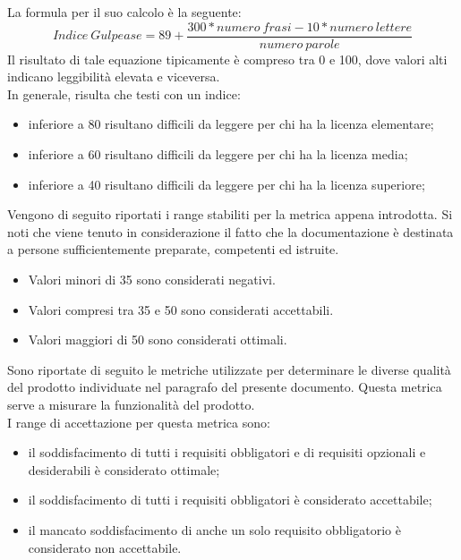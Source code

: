 					La formula per il suo calcolo è la seguente:
					\begin{equation}
						\label{eq:gulpease}
						Indice\ Gulpease = 89 + \frac{300*numero\ frasi-10*numero\ lettere}{numero\ parole}
					\end{equation}
					Il risultato di tale equazione tipicamente è compreso tra 0 e 100, dove valori alti indicano leggibilità elevata e viceversa.\\
					In generale, risulta che testi con un indice:
					\begin{itemize}
						\item inferiore a 80 risultano difficili da leggere per chi ha la licenza elementare;
						\item inferiore a 60 risultano difficili da leggere per chi ha la licenza media;
						\item inferiore a 40 risultano difficili da leggere per chi ha la licenza superiore;
					\end{itemize}
					Vengono di seguito riportati i range stabiliti per la metrica appena introdotta. Si noti che viene tenuto in considerazione il fatto 
					che la documentazione è destinata a persone sufficientemente preparate, competenti ed istruite.
					\begin{itemize}
						\item Valori minori di 35 sono considerati negativi.
						\item Valori compresi tra 35 e 50 sono considerati accettabili.
						\item Valori maggiori di 50 sono considerati ottimali.
					\end{itemize}
			Sono riportate di seguito le metriche utilizzate per determinare le diverse qualità del prodotto individuate nel paragrafo  del presente documento.
					Questa metrica serve a misurare la funzionalità del prodotto. \\
					I range di accettazione per questa metrica sono:
					\begin{itemize}
					\item il soddisfacimento di tutti i requisiti obbligatori e di requisiti opzionali e desiderabili è considerato ottimale;
					\item il soddisfacimento di tutti i requisiti obbligatori è considerato accettabile;
					\item il mancato soddisfacimento di anche un solo requisito obbligatorio è considerato non accettabile.
					\end{itemize}
